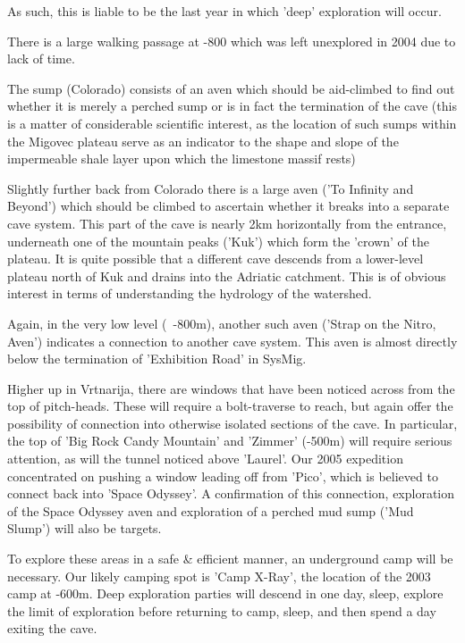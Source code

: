 As such, this is liable to be the last year in which 'deep' exploration will occur.

There is a large walking passage at -800 which was left unexplored in 2004 due to lack of time.

The sump (Colorado) consists of an aven which should be aid-climbed to find out whether it is merely a perched sump or is in fact the  termination of the cave (this is a matter of considerable scientific interest, as the location of such sumps within the Migovec plateau serve as an indicator to the shape and slope of the impermeable shale layer upon which the limestone massif rests)

Slightly further back from Colorado there is a large aven ('To Infinity and Beyond') which should be climbed to ascertain whether it breaks into a separate cave system. This part of the cave is nearly 2km horizontally from the entrance, underneath one of the mountain peaks ('Kuk') which form the 'crown' of the plateau. It is quite possible that a different cave descends from a lower-level plateau north of Kuk and drains into the Adriatic catchment. This is of obvious interest in terms of understanding the hydrology of the watershed.

Again, in the very low level (~-800m), another such aven ('Strap on the Nitro, Aven') indicates a connection to another cave system. This aven is almost directly below the termination of 'Exhibition Road' in SysMig.

Higher up in Vrtnarija, there are windows that have been noticed across from the top of pitch-heads. These will require a bolt-traverse to reach, but again offer the possibility of connection into otherwise isolated sections of the cave. In particular, the top of 'Big Rock Candy Mountain' and 'Zimmer' (-500m) will require serious attention, as will the tunnel noticed above 'Laurel'.
Our 2005 expedition concentrated on pushing a window leading off from 'Pico', which is believed to connect back into 'Space Odyssey'. A confirmation of this connection, exploration of the Space Odyssey aven and exploration of a perched mud sump ('Mud Slump') will also be targets.

To explore these areas in a safe \& efficient manner, an underground camp will be necessary. Our likely camping spot is 'Camp X-Ray', the location of the 2003 camp at -600m. Deep exploration parties will descend in one day, sleep, explore the limit of exploration before returning to camp, sleep, and then spend a day exiting the cave.

